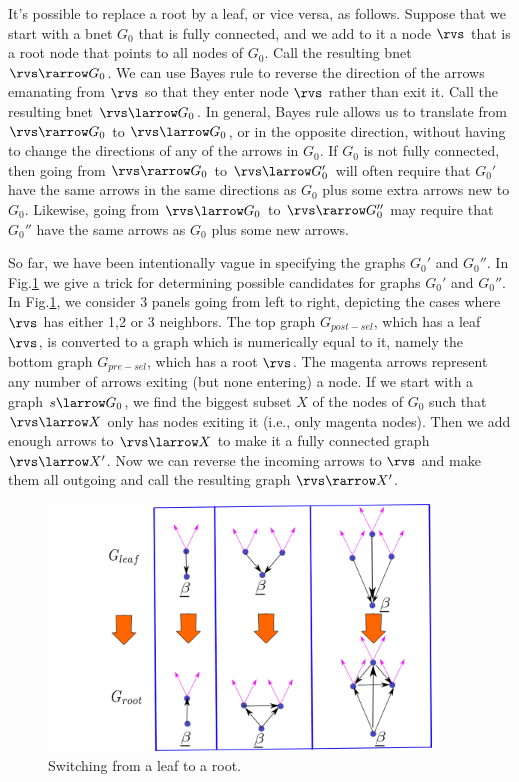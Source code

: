 It's possible to replace a root
by a leaf, or vice versa, as
follows.
Suppose that we start with
a bnet $G_0$ that is fully connected, and
we add to it a node $\rvs$
that is a root node that points
to all nodes of $G_0$.
Call the resulting bnet $\rvs\rarrow G_0$.
We can use Bayes rule to reverse the direction
of the arrows emanating from $\rvs$
so that they enter node $\rvs$
rather than exit
it.
Call the resulting bnet $\rvs\larrow G_0$.
In general,
Bayes rule allows us to translate
from $\rvs\rarrow G_0$ to
$\rvs\larrow G_0$,
or in the opposite direction,
without having to change the
directions of any of the arrows in $G_0$.
If $G_0$ is not fully connected, then
going from
$\rvs\rarrow G_0$ to
$\rvs\larrow G_0'$
will often require that $G_0'$
have the same arrows in the same
directions as $G_0$
plus some extra arrows
new to $G_0$.
Likewise, going
from
$\rvs\larrow G_0$ to
$\rvs\rarrow G_0''$
may require that $G_0''$ have
the same arrows as $G_0$ plus some new arrows.

So far, we have
been intentionally
vague in specifying the graphs
$G_0'$ and $G_0''$.
In Fig.\ref{fig-sel-nd-reversal}
we give a trick for determining
possible candidates for
graphs $G_0'$ and $G_0''$.
In
Fig.\ref{fig-sel-nd-reversal},
we consider 3 panels going from left
to right, depicting
the cases where $\rvs$ has either 1,2 or 3 neighbors.
The top graph
 $G_{post-sel}$, which has
a leaf $\rvs$, is converted
to a graph which is numerically
equal to it, namely
the bottom
graph
 $G_{pre-sel}$, which has
a root $\rvs$.
The magenta arrows represent
any number of arrows
exiting (but none entering)
a node.
If we start
with a graph $s\larrow G_0$,
we find the biggest subset $X$ of
the nodes of $G_0$ such
that $\rvs\larrow X$ only has nodes
exiting it (i.e., only magenta nodes).
Then we add enough
arrows to $\rvs\larrow X$
to make it a fully connected graph
$\rvs\larrow X'$.
Now we can reverse the incoming
arrows to $\rvs$ and make them
all outgoing and call the
resulting graph $\rvs\rarrow X'$.


\begin{figure}[h!]
\centering
\includegraphics[width=4in]
{sb-removal/sel-nd-reversal.png}
\caption{Switching
from a leaf
to a root.}
\label{fig-sel-nd-reversal}
\end{figure}

